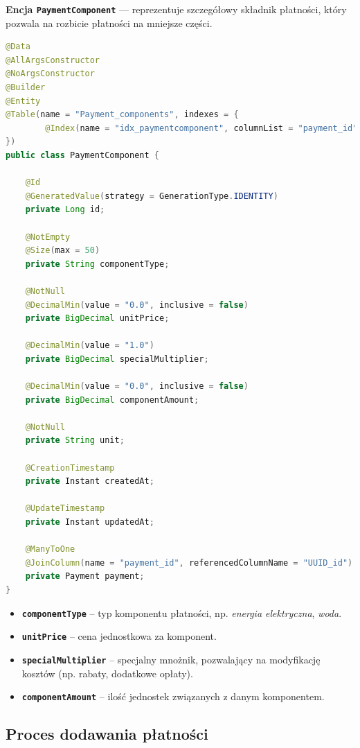 \textbf{Encja \texttt{PaymentComponent}} --- reprezentuje szczegółowy składnik płatności, który pozwala na rozbicie płatności na mniejsze części.

\begin{lstlisting}[language=Java, style=JavaStyle, caption=Kod encji \texttt{PaymentComponent}]
@Data
@AllArgsConstructor
@NoArgsConstructor
@Builder
@Entity
@Table(name = "Payment_components", indexes = {
        @Index(name = "idx_paymentcomponent", columnList = "payment_id")
})
public class PaymentComponent {

    @Id
    @GeneratedValue(strategy = GenerationType.IDENTITY)
    private Long id;

    @NotEmpty
    @Size(max = 50)
    private String componentType;

    @NotNull
    @DecimalMin(value = "0.0", inclusive = false)
    private BigDecimal unitPrice;

    @DecimalMin(value = "1.0")
    private BigDecimal specialMultiplier;

    @DecimalMin(value = "0.0", inclusive = false)
    private BigDecimal componentAmount;

    @NotNull
    private String unit;

    @CreationTimestamp
    private Instant createdAt;

    @UpdateTimestamp
    private Instant updatedAt;

    @ManyToOne
    @JoinColumn(name = "payment_id", referencedColumnName = "UUID_id")
    private Payment payment;
}
\end{lstlisting}

\begin{itemize}
    \item \textbf{\texttt{componentType}} -- typ komponentu płatności, np. \emph{energia elektryczna}, \emph{woda}.
    \item \textbf{\texttt{unitPrice}} -- cena jednostkowa za komponent.
    \item \textbf{\texttt{specialMultiplier}} -- specjalny mnożnik, pozwalający na modyfikację kosztów (np. rabaty, dodatkowe opłaty).
    \item \textbf{\texttt{componentAmount}} -- ilość jednostek związanych z danym komponentem.
\end{itemize}

\subsection{Proces dodawania płatności}

